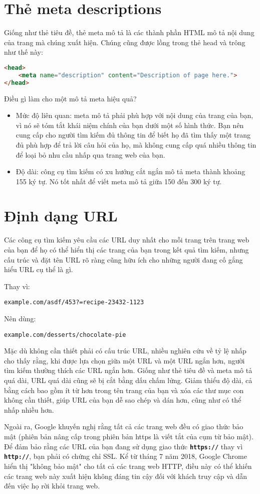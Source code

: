 \section{Thẻ meta descriptions}
Giống như thẻ tiêu đề, thẻ meta mô tả là các thành phần HTML mô tả nội dung của trang mà chúng xuất hiện. Chúng cũng được lồng trong thẻ head và trông như thế này:
\begin{lstlisting}[language=html]
<head>
	<meta name="description" content="Description of page here.">
</head>
\end{lstlisting}
\par
Điều gì làm cho một mô tả meta hiệu quả?
\begin{itemize}
	\item Mức độ liên quan: meta mô tả phải phù hợp với nội dung của trang của bạn, vì nó sẽ tóm tắt khái niệm chính của bạn dưới một số hình thức. Bạn nên cung cấp cho người tìm kiếm đủ thông tin để biết họ đã tìm thấy một trang đủ phù hợp để trả lời câu hỏi của họ, mà không cung cấp quá nhiều thông tin để loại bỏ nhu cầu nhấp qua trang web của bạn.
	\item Độ dài: công cụ tìm kiếm có xu hướng cắt ngắn mô tả meta thành khoảng 155 ký tự. Nó tốt nhất để viết meta mô tả giữa 150 đến 300 ký tự.
\end{itemize}
\section{Định dạng URL}
Các công cụ tìm kiếm yêu cầu các URL duy nhất cho mỗi trang trên trang web của bạn để họ có thể hiển thị các trang của bạn trong kết quả tìm kiếm, nhưng cấu trúc và đặt tên URL rõ ràng cũng hữu ích cho những người đang cố gắng hiểu URL cụ thể là gì.
\par
Thay vì:
\begin{lstlisting}
example.com/asdf/453?=recipe-23432-1123
\end{lstlisting}
\par
Nên dùng:
\begin{lstlisting}
example.com/desserts/chocolate-pie
\end{lstlisting}
\par
Mặc dù không cần thiết phải có cấu trúc URL, nhiều nghiên cứu về tỷ lệ nhấp cho thấy rằng, khi được lựa chọn giữa một URL và một URL ngắn hơn, người tìm kiếm thường thích các URL ngắn hơn. Giống như thẻ tiêu đề và meta mô tả quá dài, URL quá dài cũng sẽ bị cắt bằng dấu chấm lửng. Giảm thiểu độ dài, cả bằng cách bao gồm ít từ hơn trong tên trang của bạn và xóa các thư mục con không cần thiết, giúp URL của bạn dễ sao chép và dán hơn, cũng như có thể nhấp nhiều hơn.
\par
Ngoài ra, Google khuyến nghị rằng tất cả các trang web đều có giao thức bảo mật (phiên bản nâng cấp trong phiên bản https là viết tắt của cụm từ bảo mật). Để đảm bảo rằng các URL của bạn đang sử dụng giao thức \textbf{\texttt{https://}} thay vì \textbf{\texttt{http://}}, bạn phải có chứng chỉ SSL. Kể từ tháng 7 năm 2018, Google Chrome hiển thị "không bảo mật" cho tất cả các trang web HTTP, điều này có thể khiến các trang web này xuất hiện không đáng tin cậy đối với khách truy cập và dẫn đến việc họ rời khỏi trang web.